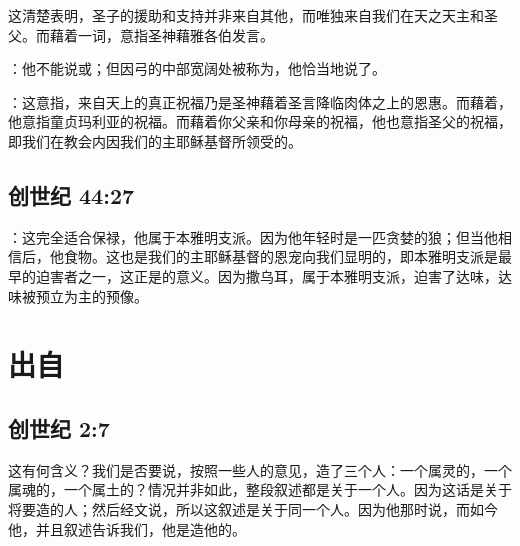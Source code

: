 这清楚表明，圣子的援助和支持并非来自其他，而唯独来自我们在天之天主和圣父。而藉着一词，意指圣神藉雅各伯发言。\par

：他不能说或；但因弓的中部宽阔处被称为，他恰当地说了。\par

：这意指，来自天上的真正祝福乃是圣神藉着圣言降临肉体之上的恩惠。而藉着，他意指童贞玛利亚的祝福。而藉着你父亲和你母亲的祝福，他也意指圣父的祝福，即我们在教会内因我们的主耶稣基督所领受的。\par


\subsection{创世纪 44:27}

\par

：这完全适合保禄，他属于本雅明支派。因为他年轻时是一匹贪婪的狼；但当他相信后，他食物。这也是我们的主耶稣基督的恩宠向我们显明的，即本雅明支派是最早的迫害者之一，这正是的意义。因为撒乌耳，属于本雅明支派，迫害了达味，达味被预立为主的预像。\par


\section{出自}


\subsection{创世纪 2:7}

这有何含义？我们是否要说，按照一些人的意见，造了三个人：一个属灵的，一个属魂的，一个属土的？情况并非如此，整段叙述都是关于一个人。因为这话是关于将要造的人；然后经文说，所以这叙述是关于同一个人。因为他那时说，而如今他，并且叙述告诉我们，他是造他的。\par

